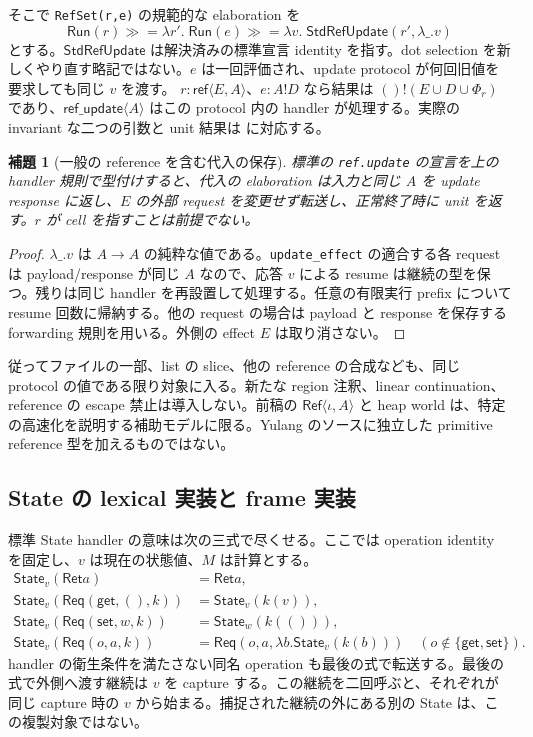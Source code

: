 \documentclass[11pt,a4paper]{article}
\newtheorem{lemma}[theorem]{補題}
\theoremstyle{remark}
\newcommand{\Ret}{\mathsf{Ret}}
\newcommand{\Req}{\mathsf{Req}}
\newcommand{\Run}{\mathsf{Run}}
\newcommand{\bind}{\mathbin{\gg\!=}}
\newcommand{\src}[2]{\href{https://github.com/momota1029/yulang/blob/a58eefc31e22141574b6f20c6a5748151c6d79f1/#1}{\detokenize{#2}}}
\begin{document}
そこで \texttt{RefSet(r,e)} の規範的な elaboration を
\[
\Run(r)\bind\lambda r'.\;
\Run(e)\bind\lambda v.\;
\mathsf{StdRefUpdate}(r',\lambda\_.v)
\]
とする。\(\mathsf{StdRefUpdate}\) は解決済みの標準宣言 identity を指す。dot selection を新しくやり直す略記ではない。\(e\) は一回評価され、update protocol が何回旧値を要求しても同じ \(v\) を渡す。
\(r:\mathsf{ref}\langle E,A\rangle\)、\(e:A!D\) なら結果は \(()!(E\cup D\cup\Phi_r)\) であり、\(\mathsf{ref\_update}\langle A\rangle\) はこの protocol 内の handler が処理する。実際の invariant な二つの引数と unit 結果は
\src{crates/infer/src/lowering/expr/tail.rs\#L197-L247}{RefSet constraint generation}
に対応する。

\begin{lemma}[一般の reference を含む代入の保存]
標準の \texttt{ref.update} の宣言を上の handler 規則で型付けすると、代入の elaboration は入力と同じ \(A\) を update response に返し、\(E\) の外部 request を変更せず転送し、正常終了時に unit を返す。\(r\) が cell を指すことは前提でない。
\end{lemma}
\begin{proof}
\(\lambda\_.v\) は \(A\to A\) の純粋な値である。\texttt{update\_effect} の適合する各 request は payload/response が同じ \(A\) なので、応答 \(v\) による resume は継続の型を保つ。残りは同じ handler を再設置して処理する。任意の有限実行 prefix について resume 回数に帰納する。他の request の場合は payload と response を保存する forwarding 規則を用いる。外側の effect \(E\) は取り消さない。
\end{proof}

従ってファイルの一部、list の slice、他の reference の合成なども、同じ protocol の値である限り対象に入る。新たな region 注釈、linear continuation、reference の escape 禁止は導入しない。前稿の \(\mathsf{Ref}\langle\iota,A\rangle\) と heap world は、特定の高速化を説明する補助モデルに限る。Yulang のソースに独立した primitive reference 型を加えるものではない。

\subsection{State の lexical 実装と frame 実装}

標準 State handler の意味は次の三式で尽くせる。ここでは operation identity を固定し、\(v\) は現在の状態値、\(M\) は計算とする。
\[
\begin{aligned}
\mathsf{State}_v(\Ret a)&=\Ret a,\\
\mathsf{State}_v(\Req(\mathsf{get},(),k))&=\mathsf{State}_v(k(v)),\\
\mathsf{State}_v(\Req(\mathsf{set},w,k))&=\mathsf{State}_w(k(())),\\
\mathsf{State}_v(\Req(o,a,k))&=\Req(o,a,\lambda b.\mathsf{State}_v(k(b)))
\quad(o\notin\{\mathsf{get},\mathsf{set}\}).
\end{aligned}
\]
handler の衛生条件を満たさない同名 operation も最後の式で転送する。最後の式で外側へ渡す継続は \(v\) を capture する。この継続を二回呼ぶと、それぞれが同じ capture 時の \(v\) から始まる。捕捉された継続の外にある別の State は、この複製対象ではない。
\end{document}
